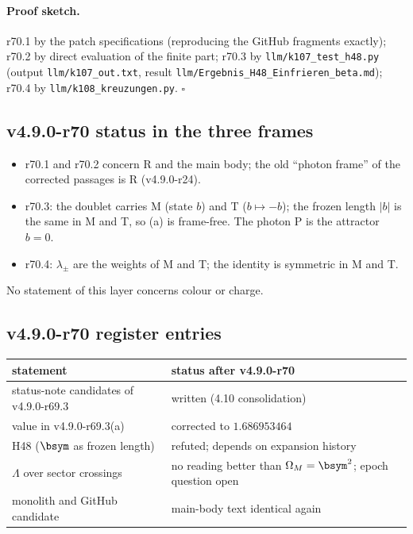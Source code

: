 \paragraph{Proof sketch.}
r70.1 by the patch specifications (reproducing the GitHub fragments exactly); r70.2 by direct evaluation of the finite part; r70.3 by
\texttt{llm/k107\_test\_h48.py} (output \texttt{llm/k107\_out.txt}, result \texttt{llm/Ergebnis\_H48\_Einfrieren\_beta.md}); r70.4 by
\texttt{llm/k108\_kreuzungen.py}.  \(\square\)

\subsection*{v4.9.0-r70 status in the three frames}
\label{subsec:v490-r70-frames}

\begin{itemize}[leftmargin=2em]
\item r70.1 and r70.2 concern R and the main body; the old ``photon frame'' of the corrected passages is R (v4.9.0-r24).
\item r70.3: the doublet carries M (state \(b\)) and T (\(b\mapsto-b\)); the frozen length \(|b|\) is the same in M and T, so (a) is frame-free.  The
photon P is the attractor \(b=0\).
\item r70.4: \(\lambda_\pm\) are the weights of M and T; the identity is symmetric in M and T.
\end{itemize}
No statement of this layer concerns colour or charge.

\subsection*{v4.9.0-r70 register entries}
\label{subsec:v490-r70-register}

\begin{center}
\small
\begin{tabular}{@{}>{\raggedright\arraybackslash}p{}>{\raggedright\arraybackslash}p{}@{}}
\toprule
statement & status after v4.9.0-r70\\
\midrule
status-note candidates of v4.9.0-r69.3 & written (4.10 consolidation)\\
value in v4.9.0-r69.3(a) & corrected to \(1.686953464\)\\
H48 (\(\bsym\) as frozen length) & refuted; depends on expansion history\\
\(\Lambda\) over sector crossings & no reading better than \(\Omega_M=\bsym^2\); epoch question open\\
monolith and GitHub candidate & main-body text identical again\\
\bottomrule
\end{tabular}
\end{center}

